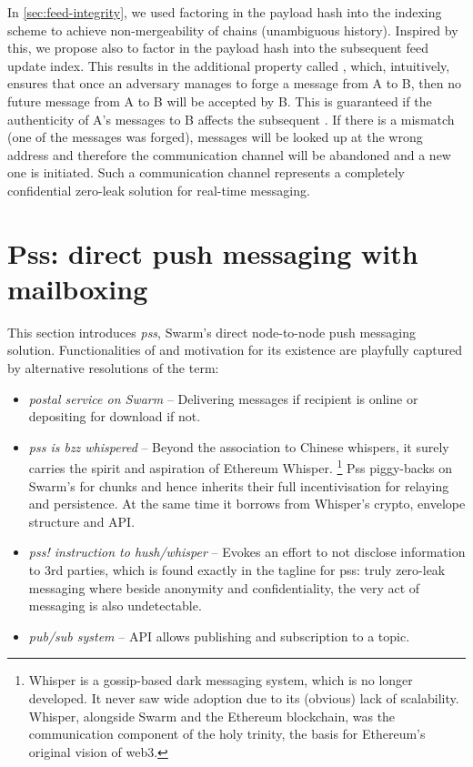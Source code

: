 In \ref{sec:feed-integrity}, we used factoring in the payload hash into the indexing scheme to achieve non-mergeability of chains (unambiguous history). Inspired by this, we propose also to factor in the payload hash into the subsequent feed update index. This results in the additional property called ,  which, intuitively, ensures that once an adversary manages to forge a message from A to B, then no future message from A to B will be accepted by B.
This is guaranteed if the authenticity of A's  messages to B affects the subsequent . If there is a mismatch (one of the messages was forged), messages will be looked up at the wrong address and therefore the communication channel will be abandoned and a new one is initiated. Such a communication channel represents a completely confidential zero-leak solution for real-time messaging.




\section{Pss: direct push messaging with mailboxing \statusgreen}\label{sec:pss}

\green{}

This section introduces \emph{pss}, Swarm's direct node-to-node push messaging solution. 
Functionalities of and motivation for its existence are playfully captured by alternative resolutions of the term:

\begin{itemize}
\item \emph{postal service on Swarm} -- Delivering messages if recipient is online or depositing for download if not.
\item \emph{pss is bzz whispered} -- Beyond the association to Chinese whispers, it surely carries the spirit and aspiration of Ethereum Whisper.%
%
\footnote{Whisper is a gossip-based dark messaging system, which is no longer developed. It never saw wide adoption due to its (obvious) lack of scalability. Whisper, alongside Swarm and the Ethereum blockchain, was the communication component of the holy trinity, the basis for Ethereum's original vision of web3.}
%
Pss piggy-backs on Swarm's  for chunks and hence inherits their full incentivisation for relaying and persistence. At the same time it borrows from Whisper's crypto, envelope structure and API.
\item \emph{pss! instruction to hush/whisper} -- Evokes an effort to not disclose information to 3rd parties, which is found exactly in the tagline for pss: truly zero-leak messaging where beside anonymity and confidentiality, the very act of messaging is also undetectable.
\item  \emph{pub/sub system} -- API allows publishing and subscription to a topic.
\end{itemize}

